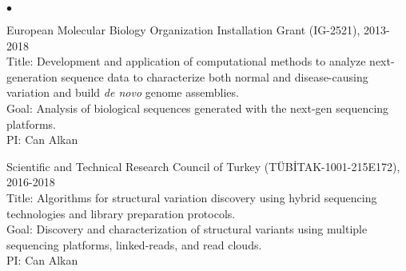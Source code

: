 \documentclass[margin,line]{res}
\newenvironment{list2}{
  \begin{list}{$\bullet$}{%
      \setlength{\itemsep}{0.1cm}
      \setlength{\parsep}{0in} \setlength{\parskip}{0in}
      \setlength{\topsep}{0in} \setlength{\partopsep}{0in} 
      \setlength{\leftmargin}{0.2in}}}{\end{list}}
\begin{document}
\begin{resume}
\begin{list2}
                                       
                                     \item
                                         European Molecular Biology Organization Installation Grant (IG-2521), 2013-2018 \\
                                         Title: Development and application of computational methods to analyze next-generation sequence data to characterize both normal and disease-causing variation and build \textit{de novo} genome assemblies.\\
                                         Goal: Analysis of biological sequences generated with the next-gen sequencing platforms.\\
                                         PI: Can Alkan
                                       \item
                                         Scientific and Technical Research Council of Turkey (T\"{U}B\.{I}TAK-1001-215E172), 2016-2018\\
                                         Title: Algorithms for structural variation discovery using hybrid sequencing technologies and library preparation protocols.\\
                                         Goal: Discovery and characterization of structural variants using multiple sequencing platforms, linked-reads, and read clouds.\\
                                         PI: Can Alkan

\clearpage
                                         

\end{list2}
\end{resume}
\end{document}
